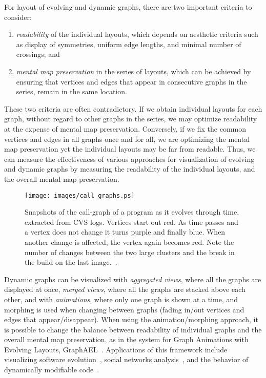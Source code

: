\documentclass[notitlepage,letter,11pt]{article}
\begin{document}
For layout of evolving and dynamic graphs, there are two important
criteria to consider:
\begin{enumerate}
\item {\em readability} of the individual layouts, which 
depends on aesthetic criteria such
as display of symmetries, uniform edge lengths, and minimal number of
crossings; and
\item {\em mental map preservation} in the series of layouts, which can be achieved by ensuring
that vertices and edges that appear in consecutive graphs in the
series, remain in the same location. 
\end{enumerate}
These two criteria are often
contradictory. If we obtain individual layouts for each graph, without
regard to other graphs in the series, we may optimize readability at
the expense of mental map preservation. Conversely, if we fix the
common vertices and edges in all graphs once and for all, we are
optimizing the mental map preservation yet the individual layouts may
be far from readable. Thus, we can measure the effectiveness of
various approaches for visualization of evolving and dynamic graphs by
measuring the readability of the individual layouts, and the overall
mental map preservation.

\begin{figure}[t]
\begin{center} 
\texttt{[image: images/call\_graphs.ps]}
\end{center}
\caption{\small\sf  
Snapshots of the call-graph of a program as it evolves through time, extracted from CVS logs. Vertices start out red. As time passes and a vertex does not change it turns purple and finally blue. When another change is affected, the vertex again becomes red. Note the number of changes between the two large clusters and the break in the build on the last image.~\cite{ck-sgbv-03}.}
\label{fig-callgraphs}
\end{figure}



Dynamic graphs can be visualized with {\em aggregated views}, where
all the graphs are displayed at once, {\em merged views}, where all the
graphs are stacked above each other, and with {\em animations}, where only
one graph is shown at a time, and morphing is used when changing
between graphs (fading in/out vertices and edges that
appear/disappear). When using the animation/morphing approach,
it is possible to change the balance between
readability of individual graphs and the overall mental map
preservation, as in the system for Graph Animations with Evolving
Layouts, GraphAEL~\cite{graphael03,fknwe-graphael-04}. Applications of
this framework include visualizing software evolution~\cite{ck-sgbv-03}, social
networks analysis~\cite{gephi}, and the behavior of dynamically modifiable
code~\cite{didfk-vbdmc-05}.
\end{document}
